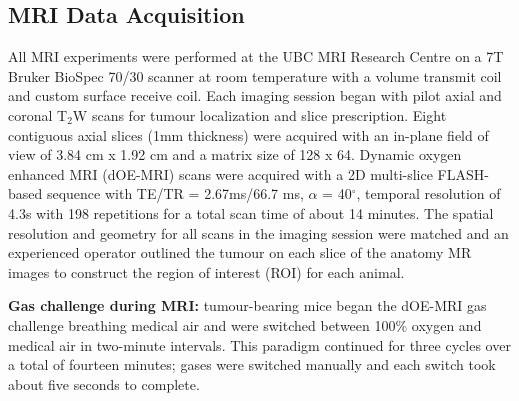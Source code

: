 \subsection{MRI Data Acquisition}
All MRI experiments were performed at the UBC MRI Research Centre on a 7T Bruker BioSpec 70/30 scanner at room temperature with a volume transmit coil and custom surface receive coil.
Each imaging session began with pilot axial and coronal T$_2$W scans for tumour localization and slice prescription.
Eight contiguous axial slices (1mm thickness) were acquired with an in-plane field of view of 3.84 cm x 1.92 cm and a matrix size of 128 x 64.
Dynamic oxygen enhanced MRI (dOE-MRI) scans were acquired with a 2D multi-slice FLASH-based sequence with TE/TR = 2.67ms/66.7 ms, $\alpha$ = 40$^\circ$, temporal resolution of 4.3s with 198 repetitions for a total scan time of about 14 minutes.
The spatial resolution and geometry for all scans in the imaging session were matched and an experienced operator outlined the tumour on each slice of the anatomy MR images to construct the region of interest (ROI) for each animal.

\noindent\textbf{Gas challenge during MRI:} tumour-bearing mice began the dOE-MRI gas challenge breathing medical air and were switched between 100\% oxygen and medical air in two-minute intervals.
This paradigm continued for three cycles over a total of fourteen minutes; gases were switched manually and each switch took about five seconds to complete.


